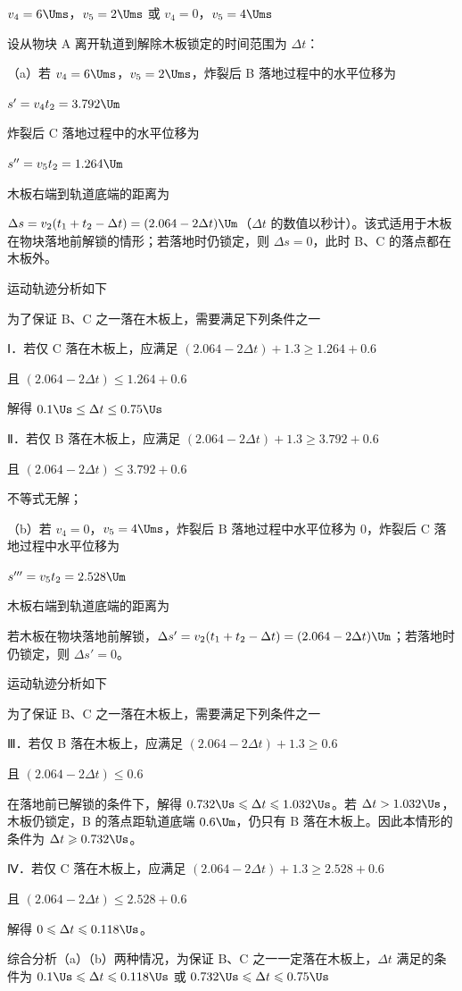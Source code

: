 \documentclass[\gkver]{gaokaozhenti}
\begin{document}
\begin{enumerate}
{$v_{4}=6\Ums$，$v_{5}=2\Ums$ 或 $v_{4}=0$，$v_{5}=4\Ums$

设从物块 A 离开轨道到解除木板锁定的时间范围为 $\Delta t$：

（a）若 $v_{4}=6\Ums$，$v_{5}=2\Ums$，炸裂后 B 落地过程中的水平位移为

$s'=v_{4}t_{2}=3.792\Um$

炸裂后 C 落地过程中的水平位移为

$s''=v_{5}t_{2}=1.264\Um$

木板右端到轨道底端的距离为

$\Delta s=v_{2}(t_{1}+t_{2}-\Delta t)=(2.064-2\Delta t)\Um$（$\Delta t$ 的数值以秒计）。该式适用于木板在物块落地前解锁的情形；若落地时仍锁定，则 $\Delta s=0$，此时 B、C 的落点都在木板外。

运动轨迹分析如下


为了保证 B、C 之一落在木板上，需要满足下列条件之一

Ⅰ．若仅 C 落在木板上，应满足 $(2.064-2\Delta t)+1.3\geq1.264+0.6$

且 $(2.064-2\Delta t)\leq1.264+0.6$

解得 $0.1\Us\leq\Delta t\leq0.75\Us$

Ⅱ．若仅 B 落在木板上，应满足 $(2.064-2\Delta t)+1.3\geq3.792+0.6$

且 $(2.064-2\Delta t)\leq3.792+0.6$

不等式无解；

（b）若 $v_{4}=0$，$v_{5}=4\Ums$，炸裂后 B 落地过程中水平位移为 0，炸裂后 C 落地过程中水平位移为

$s'''=v_{5}t_{2}=2.528\Um$

木板右端到轨道底端的距离为

若木板在物块落地前解锁，$\Delta s'=v_{2}(t_{1}+t_{2}-\Delta t)=(2.064-2\Delta t)\Um$；若落地时仍锁定，则 $\Delta s'=0$。

运动轨迹分析如下


为了保证 B、C 之一落在木板上，需要满足下列条件之一

Ⅲ．若仅 B 落在木板上，应满足 $(2.064-2\Delta t)+1.3\geq0.6$

且 $(2.064-2\Delta t)\leq0.6$

在落地前已解锁的条件下，解得 $0.732\Us\leqslant\Delta t\leqslant1.032\Us$。若 $\Delta t>1.032\Us$，木板仍锁定，B 的落点距轨道底端 $0.6\Um$，仍只有 B 落在木板上。因此本情形的条件为 $\Delta t\geqslant0.732\Us$。

Ⅳ．若仅 C 落在木板上，应满足 $(2.064-2\Delta t)+1.3\geq2.528+0.6$

且 $(2.064-2\Delta t)\leq2.528+0.6$

解得 $0\leqslant\Delta t\leqslant0.118\Us$。

综合分析（a）（b）两种情况，为保证 B、C 之一一定落在木板上，$\Delta t$ 满足的条件为 $0.1\Us\leqslant\Delta t\leqslant0.118\Us$ 或 $0.732\Us\leqslant\Delta t\leqslant0.75\Us$
}

\end{enumerate}
\end{document}
